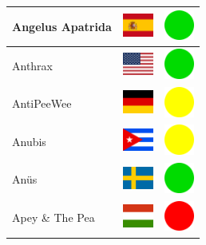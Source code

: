 \documentclass[12pt, a4paper, twoside]{report}
\begin{document}
\begin{center}
\begin{longtable}{|p{5cm}|p{2cm}|p{2cm}|}
			Angelus Apatrida & \includegraphics[width=1cm]{4x3/es} & \includegraphics[width=1cm]{likes/y} \\ \hline
			Anthrax & \includegraphics[width=1cm]{4x3/us} & \includegraphics[width=1cm]{likes/y} \\ \hline
			AntiPeeWee & \includegraphics[width=1cm]{4x3/de} & \includegraphics[width=1cm]{likes/m} \\ \hline
			Anubis & \includegraphics[width=1cm]{4x3/cu} & \includegraphics[width=1cm]{likes/m} \\ \hline
			Anüs & \includegraphics[width=1cm]{4x3/se} & \includegraphics[width=1cm]{likes/y} \\ \hline
			Apey \& The Pea & \includegraphics[width=1cm]{4x3/hu} & \includegraphics[width=1cm]{likes/n} \\ \hline

\end{longtable}
\end{center}
\end{document}
